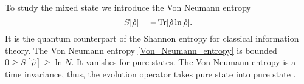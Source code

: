 To study the mixed state we introduce the Von Neumann entropy
\begin{equation}\label{Von_Neumann_entropy}
    S[\hat\rho]=-\operatorname{Tr}[\hat\rho\ln\hat\rho].
\end{equation}
It is the quantum counterpart of the Shannon entropy for classical information theory.
The Von Neumann entropy \eqref{Von_Neumann_entropy} is bounded $0\geq S[\hat\rho] \geq \ln N$. It vanishes for pure states.
The Von Neumann entropy is a time invariance, thus, the evolution operator takes pure state into pure state \cite{Nielsen_Chuang_2010}.
\begin{comment}
    \begin{equation}
        \begin{split}
            S[\hat\rho(t)] &=\Tr[\hat\rho(t)\ln\hat\rho(t)]= \Tr[U(t,0)\hat\rho(t)U^\dagger(t,0)\ln\left(U(t,0)\hat\rho(t)U^\dagger(t,0)\right)]\\
            &=\Tr[U(t,0)\hat\rho(0)U^\dagger(t,0)U(t,0)\ln\left(\hat\rho(0)\right)U^\dagger(t,0)]\\
            &= S[\hat\rho(0)].
        \end{split}
    \end{equation}
    We can move out the evolution operator because they are unitary, since if we consider the taylor expansion
    \begin{equation}
        \begin{split}
            \ln\left(U(t,0)\hat\rho(t)U^\dagger(t,0)\right) &= c_0U(t,0)U^\dagger(t,0) + c_1 U(t,0)\hat\rho(t)U^\dagger(t,0)\\
            & \quad + c_2 U(t,0)\hat\rho(t)U^\dagger(t,0)U(t,0)\hat\rho(t)U^\dagger(t,0) + ... \\
            &=  U(t,0)\ln\left(\hat\rho(t)\right) U^\dagger(t,0).
        \end{split}
    \end{equation}
\end{comment}

\begin{comment}
If we consider the system in contact with a thermal bath with which exchange only energy but conserving it in average, namely the canonical condition hold, there is a stationary state $\hat\rho = e^{-\beta \hat L}$ that maximize the entropy. The parameter $\beta$ is just the inverse of a pseudo-temperature that stands for the interaction with the thermal bath. 
Since the thermal bath actively changes the entries of $\hat L$, it is changing the weight of the network and the probability to move from node $i$ to $j$. Thus, we are considering a network that is changing randomly by time. 
The reader can recognize that this density matrix is the same the De Domenico has introduced \eqref{density_matrix}.
\end{comment}

